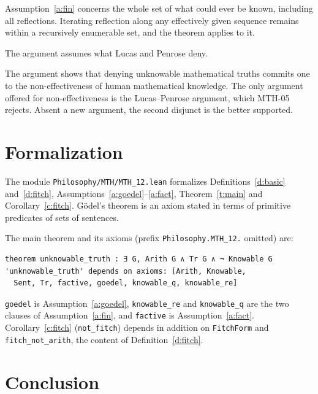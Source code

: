 \documentclass{situationist-preprint}
\begin{document}
\begin{reply}
Assumption~\ref{a:fin} concerns the whole set of what could ever be known, including all reflections. Iterating reflection along any effectively given sequence remains within a recursively enumerable set, and the theorem applies to it.
\end{reply}

\begin{objection}
The argument assumes what Lucas and Penrose deny.
\end{objection}

\begin{reply}
The argument shows that denying unknowable mathematical truths commits one to the non-effectiveness of human mathematical knowledge. The only argument offered for non-effectiveness is the Lucas--Penrose argument, which MTH-05 rejects. Absent a new argument, the second disjunct is the better supported.
\end{reply}

\section{Formalization}

The module \nolinkurl{Philosophy/MTH/MTH_12.lean} formalizes Definitions~\ref{d:basic} and~\ref{d:fitch}, Assumptions~\ref{a:goedel}--\ref{a:fact}, Theorem~\ref{t:main} and Corollary~\ref{c:fitch}. Gödel's theorem is an axiom stated in terms of primitive predicates of sets of sentences.

The main theorem and its axioms (prefix \texttt{Philosophy.MTH\_12.} omitted) are:

\begin{lstlisting}
theorem unknowable_truth : ∃ G, Arith G ∧ Tr G ∧ ¬ Knowable G
'unknowable_truth' depends on axioms: [Arith, Knowable,
  Sent, Tr, factive, goedel, knowable_q, knowable_re]
\end{lstlisting}

\texttt{goedel} is Assumption~\ref{a:goedel}, \texttt{knowable\_re} and \texttt{knowable\_q} are the two clauses of Assumption~\ref{a:fin}, and \texttt{factive} is Assumption~\ref{a:fact}. Corollary~\ref{c:fitch} (\texttt{not\_fitch}) depends in addition on \texttt{FitchForm} and \texttt{fitch\_not\_arith}, the content of Definition~\ref{d:fitch}.

\section{Conclusion}
\end{document}
